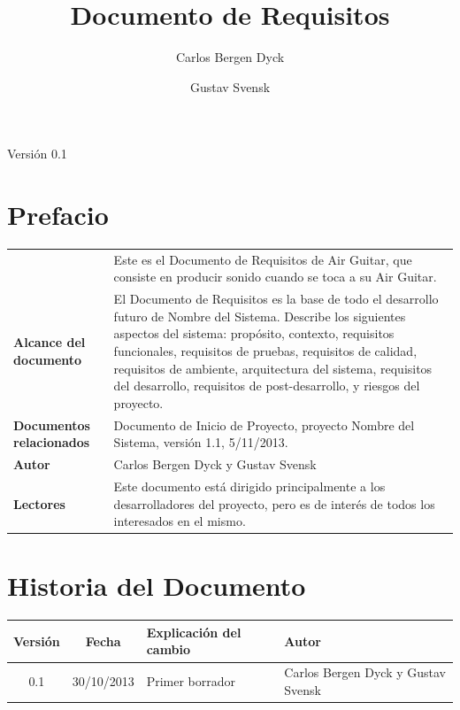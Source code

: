 \documentclass[a4paper,12pt]{article}
\title{Documento de Requisitos}
\author{Carlos Bergen Dyck \and Gustav Svensk}
\begin{document}
\renewcommand{\arraystretch}{1.5}
\maketitle
\begin{center}
        {\large Versión 0.1}
\end{center}
\newpage


\section{Prefacio}
\begin{tabular}{p{3cm} p{12cm}}
        & Este es el Documento de Requisitos de Air Guitar, que consiste en
        producir sonido cuando se toca a su Air Guitar. \\
        \textbf{Alcance del documento} & El Documento de Requisitos es la base
        de todo el desarrollo futuro de Nombre del Sistema. Describe los
        siguientes aspectos del sistema: propósito, contexto, requisitos
        funcionales, requisitos de pruebas, requisitos de calidad, requisitos
        de ambiente, arquitectura del sistema, requisitos del desarrollo,
        requisitos de post-desarrollo, y riesgos del proyecto. \\
        \textbf{Documentos relacionados} & Documento de Inicio de Proyecto,
        proyecto Nombre del Sistema, versión 1.1, 5/11/2013. \\
        \textbf{Autor} & Carlos Bergen Dyck y Gustav Svensk \\
        \textbf{Lectores} & Este documento está dirigido principalmente a los
        desarrolladores del proyecto, pero es de interés de todos los
        interesados en el mismo. \\
\end{tabular}

\section{Historia del Documento}
\begin{tabular}{|c|c|p{6cm}|p{4cm}|}
        \hline
        \textbf{Versión} & \textbf{Fecha} & \textbf{Explicación del cambio} &
        \textbf{Autor} \\ \hline
        0.1 & 30/10/2013 & Primer borrador & Carlos Bergen Dyck y Gustav Svensk \\
        \hline
\end{tabular}

\newpage
\tableofcontents
\end{document}
